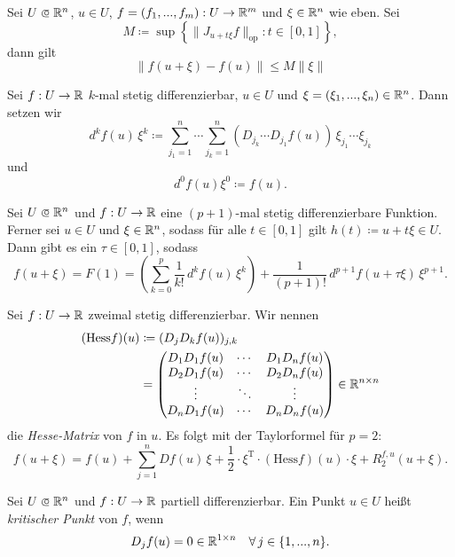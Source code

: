 \documentclass{cheat-sheet}
\newcommand\opn{\mathrel{\ooalign{$\subset$\cr
  \hidewidth\raise.1ex\hbox{$\circ\mkern.5mu$}\cr}}}
\begin{document}
\begin{kor}[Schrankensatz]
Sei $U \opn \R^n$, $u \in U$, $f = (f_1, ..., f_m) : U \to \mathbb{R}^m$ und $\xi \in \mathbb{R}^n$ wie eben. Sei
\[ M \coloneqq \sup \left\{ \| J_{u + t \xi} f \|_{\text{op}} : t \in [0, 1] \right\}, \]
dann gilt
\[ \| f(u + \xi) - f(u) \| \le M \| \xi \| \]
\end{kor}

\begin{nota}
Sei $f : U \to \mathbb{R}$ $k$-mal stetig differenzierbar, $u \in U$ und $\xi = (\xi_1, ..., \xi_n) \in \mathbb{R}^n$. Dann setzen wir
\[ d^k f(u)\,\xi^k \coloneqq \sum_{j_1=1}^n \cdots \sum_{j_k=1}^n (D_{j_k} \cdots D_{j_1} f(u))\,\xi_{j_1}\cdots\xi_{j_k} \]
und
\[ d^0 f(u) \xi^0 \coloneqq f(u). \]
\end{nota}

\begin{satz}
Sei $U \opn \R^n$ und $f : U \to \mathbb{R}$ eine $(p + 1)$-mal stetig differenzierbare Funktion. Ferner sei $u \in U$ und $\xi \in \mathbb{R}^n$, sodass für alle $t \in [0, 1]$ gilt $h(t) \coloneqq u + t \xi \in U$. Dann gibt es ein $\tau \in [0, 1]$, sodass
\[ f(u + \xi) = F(1) = \left( \sum_{k=0}^{p} \frac{1}{k!}\,d^k f(u)\,\xi^k \right) + \frac{1}{(p + 1)!}\,d^{p+1} f(u + \tau \xi)\,\xi^{p+1}. \]
\end{satz}

\begin{bem}[Taylorformel für $p = 2$]
Sei $f : U \to \mathbb{R}$ zweimal stetig differenzierbar. Wir nennen
\begin{align*}
  (\mathrm{Hess} f)(u) &\coloneqq (D_j D_k f(u))_{j,k}\\
  &= \begin{pmatrix} D_1 D_1 f(u) & \cdots & D_1 D_n f(u) \\ D_2 D_1 f(u) & \cdots & D_2 D_n f(u) \\ \vdots & \ddots & \vdots \\ D_n D_1 f(u) & \cdots & D_n D_n f(u) \end{pmatrix} \in \mathbb{R}^{n \times n}
\end{align*}
die \emph{Hesse-Matrix} von $f$ in $u$. Es folgt mit der Taylorformel für $p = 2$:
\[ f(u + \xi) = f(u) + \sum_{j=1}^{n} D f(u)\,\xi + \frac{1}{2} \cdot \xi^{\text{T}} \cdot (\mathrm{Hess} f)(u) \cdot \xi + R_2^{f,u}(u + \xi). \]
\end{bem}

\begin{defn}
Sei $U \opn \R^n$ und $f : U \to \mathbb{R}$ partiell differenzierbar. Ein Punkt $u \in U$ heißt \emph{kritischer Punkt} von $f$, wenn
\[ D_j f(u) = 0 \in \mathbb{R}^{1 \times n}\quad \forall\,j \in \{ 1, ..., n \}. \]
\end{defn}
\end{document}
